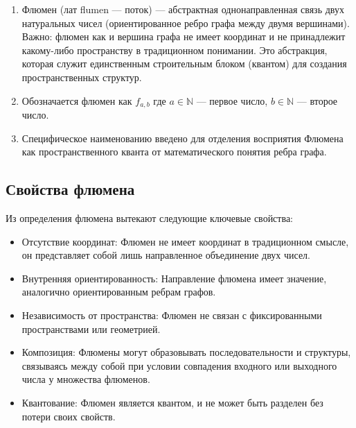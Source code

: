 \documentclass[final]{article}
\begin{document}
        \begin{enumerate}

            \item Флюмен (лат flumen — поток) — абстрактная однонаправленная 
            связь двух натуральных чисел (ориентированное ребро графа между 
            двумя вершинами). Важно: флюмен как и вершина графа не имеет 
            координат и не принадлежит какому-либо пространству в традиционном 
            понимании. Это абстракция, которая служит единственным строительным 
            блоком (квантом) для создания пространственных структур.

            \item Обозначается флюмен как \( f_{a,b} \) где \( a \in \mathbb{N} \) — 
            первое число, \( b \in \mathbb{N} \) — второе число.

            \item Специфическое наименованию введено для отделения восприятия 
            Флюмена как пространственного кванта от математического понятия ребра 
            графа.

        \end{enumerate}



    \subsection{Свойства флюмена}

        Из определения флюмена вытекают следующие ключевые свойства:
        \begin{itemize}
            \item Отсутствие координат: Флюмен не имеет координат в традиционном 
            смысле, он представляет собой лишь направленное объединение двух 
            чисел.
            \item Внутренняя ориентированность: Направление флюмена имеет 
            значение, аналогично ориентированным ребрам графов.
            \item Независимость от пространства: Флюмен не связан с фиксированными
            пространствами или геометрией.
            \item Композиция: Флюмены могут образовывать последовательности и 
            структуры, связываясь между собой при условии совпадения входного 
            или выходного числа у множества флюменов.
            \item Квантование: Флюмен является квантом, и не может быть разделен 
            без потери своих свойств.
        \end{itemize}
\end{document}
